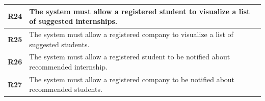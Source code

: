 \begin{table}[H]
\begin{tabular}{|l|m{10cm}|}
        \hline \textbf{R24} & The system must allow a registered student to visualize a list of suggested internships. \\
        \hline \textbf{R25} & The system must allow a registered company to visualize a list of suggested students. \\
        \hline \textbf{R26} & The system must allow a registered student to be notified about recommended internship. \\
        \hline \textbf{R27} & The system must allow a registered company to be notified about recommended students. \\
        \hline
    \end{tabular}
\end{table}

